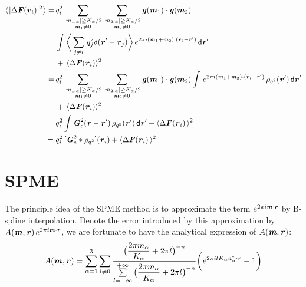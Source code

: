 \documentclass[aps,pre,preprint]{revtex4}
\renewcommand{\v}[1]{\textbf{\textit{#1}}}
\renewcommand{\d}[1]{\textsf{#1}}
\begin{document}
\begin{align}\nonumber
  \big\langle
  \vert\Delta\v F(\v r_i)\vert^2
  \big\rangle
  = \,&
  q^2_i
  \sum_{
    \begin{subarray}{c}
      \vert m_{1,\alpha}\vert \geq K_\alpha/2\\
      \v m_1\neq 0
    \end{subarray}}
  \sum_{
    \begin{subarray}{c}
      \vert m_{2,\alpha}\vert \geq K_\alpha/2\\
      \v m_2\neq 0
    \end{subarray}}
  \v g(\v m_1)\cdot\v g(\v m_2) \\\nonumber
  \,&
  \int
  \bigg\langle
  \sum_{j\neq i}\,q_j^2
  \delta (\v r' - \v r_j)
  \bigg\rangle
  \,e^{2\pi i(\v m_1 + \v m_2)\cdot(\v r_i - \v r')}
  \,\d d\v r' \\ \nonumber
  &+\,
  \langle\Delta\v F(\v r_i)\rangle^2 \\ \nonumber
  =\,&
  q^2_i
  \sum_{
    \begin{subarray}{c}
      \vert m_{1,\alpha}\vert \geq K_\alpha/2\\
      \v m_1\neq 0
    \end{subarray}}
  \sum_{
    \begin{subarray}{c}
      \vert m_{2,\alpha}\vert \geq K_\alpha/2\\
      \v m_2\neq 0
    \end{subarray}}
  \v g(\v m_1)\cdot\v g(\v m_2) 
  \int
  \,e^{2\pi i(\v m_1 + \v m_2)\cdot(\v r_i - \v r')}
  \,\rho_{q^2}(\v r')
  \,\d d\v r' \\  \nonumber
  &+\,
  \langle\Delta\v F(\v r_i)\rangle^2 \\ 
  =\;&
  q^2_i
  \int \v G^2_c(\v r - \v r')\,\rho_{q^2}(\v r')\,\d d\v r'  
  + 
  \langle\Delta\v F(\v r_i)\,\rangle^2 \\
  =\;&
  q_i^2\,[\v G_c^2\ast\rho_{q^2}] (\v r_i) + \langle\Delta\v F(\v r_i)\,\rangle^2 
\end{align}



\section{SPME}
The principle idea of the SPME method is to approximate the term
$e^{2\pi i\v m\cdot\v r}$ by B-spline interpolation. Denote the error
introduced by this approximation by $A(\v m, \v r)\,e^{2\pi i\v m\cdot
  \v r}$, we are fortunate to have the analytical expression of $A(\v m, \v r)$:
\begin{align}
  A(\v m, \v r)
  =
  \sum_{\alpha=1}^3\sum_{l\neq 0}
  \frac
  {\big(\dfrac{2\pi m_\alpha}{K_\alpha} + 2\pi l\big)^{-n}}
  {\sum\limits_{l=-\infty}^{+\infty}
    \big(\dfrac{2\pi m_\alpha}{K_\alpha} + 2\pi l\big)^{-n}}
  \bigg(
  e^{2\pi i l K_\alpha\v a^\ast_\alpha\cdot \v r} - 1
  \bigg)
\end{align}
\end{document}
